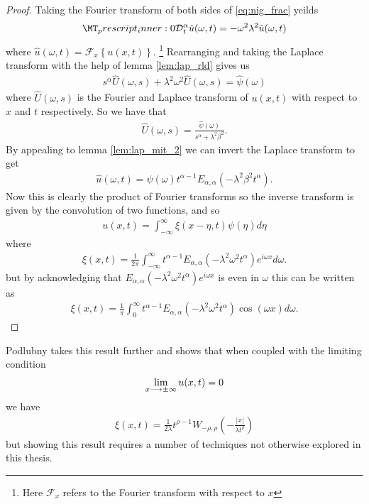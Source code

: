 \begin{proof}
    Taking the Fourier transform of both sides of \eqref{eq:nig_frac} yeilds
    \begin{align*}
        \prescript{}{0}{\mathcal{D}}^\alpha_t \hat{u}(\omega,t) = -\omega^2\lambda^2 \hat{u}(\omega, t)
    \end{align*}
    where $ \hat{u}(\omega, t) = \mathcal{F}_x\left\{ u(x,t) \right\} $. \footnote{Here $ \mathcal{F}_x $ refers to the Fourier transform with respect to $ x $}
    Rearranging and taking the Laplace transform with the help of lemma \ref{lem:lap_rld} gives us
    \begin{align*}
        s^\alpha\hat{U}(\omega, s) + \lambda^2\omega^2 \hat{U}(\omega,s) = \hat{\psi}(\omega)
    \end{align*}
    where $ \hat{U}(\omega, s) $ is the Fourier and Laplace transform of $ u(x,t) $ with respect to $ x $ and $ t $ respectively.
    So we have that
    \begin{align*}
        \hat{U}(\omega, s) = \frac{\hat{\psi}(\omega)}{s^\alpha + \lambda^2\beta^2}.
    \end{align*}
    By appealing to lemma \ref{lem:lap_mit_2} we can invert the Laplace transform to get
    \begin{align*}
        \hat{u}(\omega, t) = \psi(\omega)t^{\alpha-1} E_{\alpha, \alpha}(-\lambda^2\beta^2t^\alpha).
    \end{align*}
    Now this is clearly the product of Fourier transforms so the inverse transform is given by the convolution of two functions, and so
    \begin{align*}
        u(x,t) = \int_{-\infty}^\infty \xi(x - \eta, t) \psi(\eta) d\eta
    \end{align*}
    where
    \begin{align*}
        \xi(x,t) = \frac{1}{2\pi} \int_{-\infty}^\infty t^{\alpha - 1} E_{\alpha, \alpha}(-\lambda^2\omega^2t^\alpha)e^{i\omega x}d\omega.
    \end{align*}
    but by acknowledging that $ E_{\alpha, \alpha}(-\lambda^2\omega^2t^\alpha)e^{i\omega x} $ is even in $ \omega $ this can be written as 
    \begin{align*}
        \xi(x,t) = \frac{1}{\pi} \int_0^\infty t^{\alpha - 1} E_{\alpha, \alpha}(-\lambda^2\omega^2t^\alpha)\cos(\omega x)d\omega.
    \end{align*}
\end{proof}
    Podlubny \cite{Podlubny1999} takes this result further and shows that when coupled with the limiting condition
    \begin{align*}
        \lim_{x \longrightarrow \pm \infty} u(x,t) = 0
    \end{align*}
    we have
    \begin{align*}
        \xi(x,t) = \frac{1}{2\lambda} t^{\rho-1}W_{-\rho,\rho}\left(-\frac{|x|}{\lambda t^\rho}\right)
    \end{align*}
    but showing this result requires a number of techniques not otherwise explored in this thesis.
    
